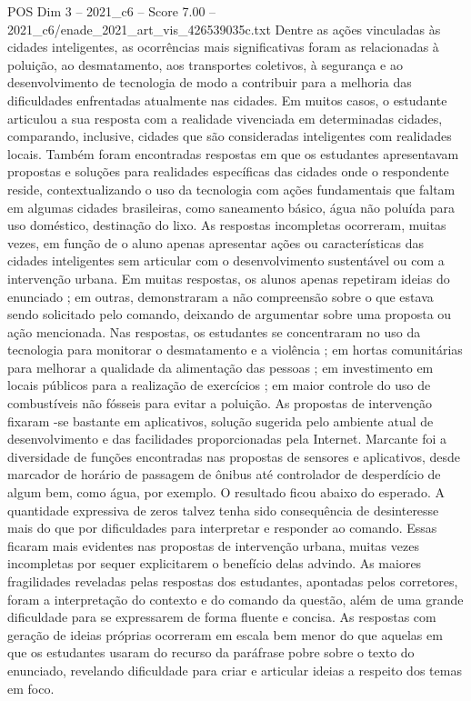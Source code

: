 \begin{textsample}{POS Dim 3 – 2021\_c6 – Score 7.00 – 2021\_c6/enade\_2021\_art\_vis\_426539035c.txt}
Dentre as ações vinculadas às cidades inteligentes, as ocorrências mais significativas foram as relacionadas à poluição, ao desmatamento, aos transportes coletivos, à segurança e ao desenvolvimento de tecnologia de modo a contribuir para a melhoria das dificuldades enfrentadas atualmente nas cidades.
Em muitos casos, o estudante articulou a sua resposta com a realidade vivenciada em determinadas cidades, comparando, inclusive, cidades que são consideradas inteligentes com realidades locais.
Também foram encontradas respostas em que os estudantes apresentavam propostas e soluções para realidades específicas das cidades onde o respondente reside, contextualizando o uso da tecnologia com ações fundamentais que faltam em algumas cidades brasileiras, como saneamento básico, água não poluída para uso doméstico, destinação do lixo.
As respostas incompletas ocorreram, muitas vezes, em função de o aluno apenas apresentar ações ou características das cidades inteligentes sem articular com o desenvolvimento sustentável ou com a intervenção urbana.
Em muitas respostas, os alunos apenas repetiram ideias do enunciado ; em outras, demonstraram a não compreensão sobre o que estava sendo solicitado pelo comando, deixando de argumentar sobre uma proposta ou ação mencionada.
Nas respostas, os estudantes se concentraram no uso da tecnologia para monitorar o desmatamento e a violência ; em hortas comunitárias para melhorar a qualidade da alimentação das pessoas ; em investimento em locais públicos para a realização de exercícios ; em maior controle do uso de combustíveis não fósseis para evitar a poluição.
As propostas de intervenção fixaram -se bastante em aplicativos, solução sugerida pelo ambiente atual de desenvolvimento e das facilidades proporcionadas pela Internet.
Marcante foi a diversidade de funções encontradas nas propostas de sensores e aplicativos, desde marcador de horário de passagem de ônibus até controlador de desperdício de algum bem, como água, por exemplo.
O resultado ficou abaixo do esperado.
A quantidade expressiva de zeros talvez tenha sido consequência de desinteresse mais do que por dificuldades para interpretar e responder ao comando.
Essas ficaram mais evidentes nas propostas de intervenção urbana, muitas vezes incompletas por sequer explicitarem o benefício delas advindo.
As maiores fragilidades reveladas pelas respostas dos estudantes, apontadas pelos corretores, foram a interpretação do contexto e do comando da questão, além de uma grande dificuldade para se expressarem de forma fluente e concisa.
As respostas com geração de ideias próprias ocorreram em escala bem menor do que aquelas em que os estudantes usaram do recurso da paráfrase pobre sobre o texto do enunciado, revelando dificuldade para criar e articular ideias a respeito dos temas em foco.

\end{textsample}
